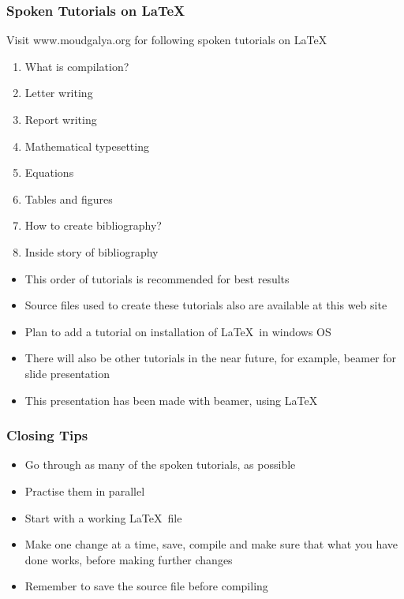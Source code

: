 \documentclass[blue]{beamer}
\begin{document}
\begin{frame}
\frametitle{Spoken Tutorials on \LaTeX}
Visit {\color{magenta}www.moudgalya.org} for following spoken
tutorials on \LaTeX
\begin{enumerate}
\item<+-|alert@+> What is compilation?
\item<+-|alert@+> Letter writing
\item<+-|alert@+> Report writing
\item<+-|alert@+> Mathematical typesetting
\item<+-|alert@+> Equations
\item<+-|alert@+> Tables and figures
\item<+-|alert@+> How to create bibliography?
\item<+-|alert@+> Inside story of bibliography
\end{enumerate}
\begin{itemize}
\item<+-|alert@+> This order of tutorials is recommended for best results
\item<+-|alert@+> Source files used to create these tutorials
  also are available at this web site 
\item<+-|alert@+> Plan to add a tutorial on 
  installation of \LaTeX\ in windows OS
\item<+-|alert@+> There will also be other tutorials in the near
  future, for example, beamer for slide presentation
\item<+-|alert@+> This presentation has been made with beamer,
  using \LaTeX\
\end{itemize}
\end{frame}

\begin{frame}
\frametitle{Closing Tips}
\begin{itemize}
\item<+-|alert@+> Go through as many of the spoken tutorials, as
  possible
\item<+-|alert@+> Practise them in parallel
\item<+-|alert@+> Start with a working \LaTeX\ file
\item<+-|alert@+> Make one change at a time, save, compile and
  make sure that what you have done works, before making further
  changes 
\item<+-|alert@+> Remember to save the source file before
  compiling 
\end{itemize}
\end{frame}
\end{document}
